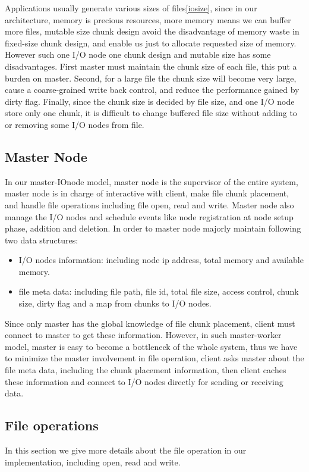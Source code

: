 Applications usually generate various sizes of files\ref{iosize}, since in our architecture, memory is precious resources, more memory means we can buffer more files,
mutable size chunk design avoid the disadvantage of memory waste in fixed-size chunk design, and enable us just to allocate requested size of memory.
However such one I/O node one chunk design and mutable size has some disadvantages. First master must maintain the chunk size of each file, this put a burden on master.
Second, for a large file the chunk size will become very large, cause a coarse-grained write back control, and reduce the performance gained by dirty flag.
Finally, since the chunk size is decided by file size, and one I/O node store only one chunk, it is difficult to change buffered file size without adding to or removing some I/O nodes from file.

\subsection{Master Node}
In our master-IOnode model, master node is the supervisor of the entire system,
master node is in charge of interactive with client, make file chunk placement, and handle file operations including file open, read and write.
Master node also manage the I/O nodes and schedule events like node registration at node setup phase, addition and deletion.
In order to master node majorly maintain following two data structures:
\begin{itemize}
  \item I/O nodes information: including node ip address, total memory and available memory.
  \item file meta data: including file path, file id, total file size, access control, chunk size, dirty flag and a map from chunks to I/O nodes.
\end{itemize}

Since only master has the global knowledge of file chunk placement, client must connect to master to get these information.
However, in such master-worker model, master is easy to become a bottleneck of the whole system,
thus we have to minimize the master involvement in file operation, client asks master about the file meta data, including the chunk placement information,
then client caches these information and connect to I/O nodes directly for sending or receiving data.

\subsection{File operations}
In this section we give more details about the file operation in our implementation, including open, read and write.

